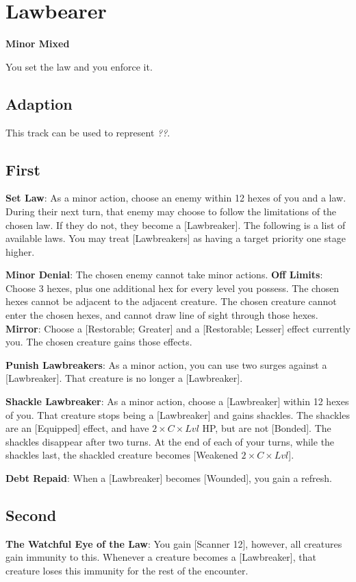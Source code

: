 \section{Lawbearer}
\textbf{Minor Mixed}

You set the law and you enforce it.

\subsection*{Adaption}
This track can be used to represent \emph{??}.

\begin{multicols*}{2}
\subsection*{First \Facet\perk}
\textbf{Set Law}: As a minor action, choose an enemy within 12 hexes of you and a law. During their next turn, that enemy may choose to follow the limitations of the chosen law. If they do not, they become a [Lawbreaker]. The following is a list of available laws. You may treat [Lawbreakers] as having a target priority one stage higher.
\begin{itemize}
\thing \textbf{Minor Denial}: The chosen enemy cannot take minor actions.
\thing \textbf{Off Limits}: Choose 3 hexes, plus one additional hex for every level you possess. The chosen hexes cannot be adjacent to the adjacent creature. The chosen creature cannot enter the chosen hexes, and cannot draw line of sight through those hexes.
\thing \textbf{Mirror}: Choose a [Restorable; Greater] and a [Restorable; Lesser] effect currently you. The chosen creature gains those effects.
\end{itemize}

\textbf{Punish Lawbreakers}: As a minor action, you can use two surges against a [Lawbreaker]. That creature is no longer a [Lawbreaker].

\textbf{Shackle Lawbreaker}: As a minor action, choose a [Lawbreaker] within 12 hexes of you. That creature stops being a [Lawbreaker] and gains shackles. The shackles are an [Equipped] effect, and have $2\times C\times Lvl$ HP, but are not [Bonded]. The shackles disappear after two turns. At the end of each of your turns, while the shackles last, the shackled creature becomes [Weakened $2 \times C\times Lvl$].

\textbf{Debt Repaid}: When a [Lawbreaker] becomes [Wounded], you gain a refresh.

\subsection*{Second \Facet\perk}
\textbf{The Watchful Eye of the Law}: You gain [Scanner 12], however, all creatures gain immunity to this. Whenever a creature becomes a [Lawbreaker], that creature loses this immunity for the rest of the encounter.



\end{multicols*}
